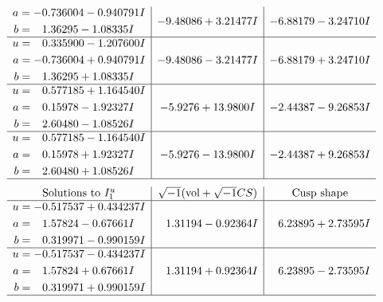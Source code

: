 \documentclass[1p]{elsarticle_modified}
\theoremstyle{definition}
\newcommand{\I}{\sqrt{-1}}
\begin{document}
$$\begin{array}{c|c|c}
\begin{aligned}
a &= -0.736004 - 0.940791 I \\
b &= \phantom{-}1.36295 - 1.08335 I\end{aligned}
 & -9.48086 + 3.21477 I & -6.88179 - 3.24710 I \\ \hline\begin{aligned}
u &= \phantom{-}0.335900 - 1.207600 I \\
a &= -0.736004 + 0.940791 I \\
b &= \phantom{-}1.36295 + 1.08335 I\end{aligned}
 & -9.48086 - 3.21477 I & -6.88179 + 3.24710 I \\ \hline\begin{aligned}
u &= \phantom{-}0.577185 + 1.164540 I \\
a &= \phantom{-}0.15978 - 1.92327 I \\
b &= \phantom{-}2.60480 - 1.08526 I\end{aligned}
 & -5.9276 + 13.9800 I & -2.44387 - 9.26853 I \\ \hline\begin{aligned}
u &= \phantom{-}0.577185 - 1.164540 I \\
a &= \phantom{-}0.15978 + 1.92327 I \\
b &= \phantom{-}2.60480 + 1.08526 I\end{aligned}
 & -5.9276 - 13.9800 I & -2.44387 + 9.26853 I\\
 \hline 
 \end{array}$$\newpage$$\begin{array}{c|c|c}  
\text{Solutions to }I^u_{1}& \I (\text{vol} + \sqrt{-1}CS) & \text{Cusp shape}\\
 \hline 
\begin{aligned}
u &= -0.517537 + 0.434237 I \\
a &= \phantom{-}1.57824 - 0.67661 I \\
b &= \phantom{-}0.319971 - 0.990159 I\end{aligned}
 & \phantom{-}1.31194 - 0.92364 I & \phantom{-}6.23895 + 2.73595 I \\ \hline\begin{aligned}
u &= -0.517537 - 0.434237 I \\
a &= \phantom{-}1.57824 + 0.67661 I \\
b &= \phantom{-}0.319971 + 0.990159 I\end{aligned}
 & \phantom{-}1.31194 + 0.92364 I & \phantom{-}6.23895 - 2.73595 I\\
 \hline 
 \end{array}$$\newpage\newpage\renewcommand{\arraystretch}{1}
\end{document}
